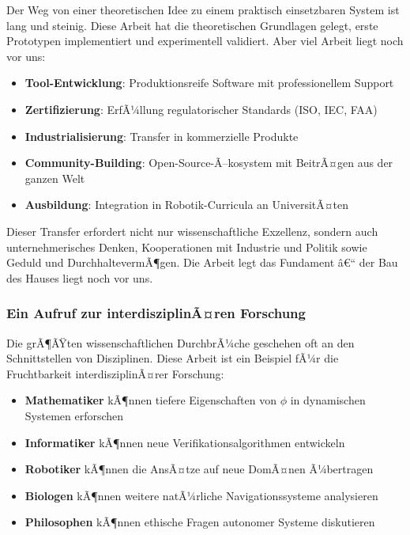 ﻿\documentclass[a4paper,12pt]{article}
\theoremstyle{definition}
\begin{document}
Der Weg von einer theoretischen Idee zu einem praktisch einsetzbaren System ist lang und steinig. Diese Arbeit hat die theoretischen Grundlagen gelegt, erste Prototypen implementiert und experimentell validiert. Aber viel Arbeit liegt noch vor uns:

\begin{itemize}
	\item \textbf{Tool-Entwicklung}: Produktionsreife Software mit professionellem Support
	\item \textbf{Zertifizierung}: ErfÃ¼llung regulatorischer Standards (ISO, IEC, FAA)
	\item \textbf{Industrialisierung}: Transfer in kommerzielle Produkte
	\item \textbf{Community-Building}: Open-Source-Ã–kosystem mit BeitrÃ¤gen aus der ganzen Welt
	\item \textbf{Ausbildung}: Integration in Robotik-Curricula an UniversitÃ¤ten
\end{itemize}

Dieser Transfer erfordert nicht nur wissenschaftliche Exzellenz, sondern auch unternehmerisches Denken, Kooperationen mit Industrie und Politik sowie Geduld und DurchhaltevermÃ¶gen. Die Arbeit legt das Fundament â€“ der Bau des Hauses liegt noch vor uns.

\subsubsection{Ein Aufruf zur interdisziplinÃ¤ren Forschung}

Die grÃ¶ÃŸten wissenschaftlichen DurchbrÃ¼che geschehen oft an den Schnittstellen von Disziplinen. Diese Arbeit ist ein Beispiel fÃ¼r die Fruchtbarkeit interdisziplinÃ¤rer Forschung:

\begin{itemize}
	\item \textbf{Mathematiker} kÃ¶nnen tiefere Eigenschaften von $\phi$ in dynamischen Systemen erforschen
	\item \textbf{Informatiker} kÃ¶nnen neue Verifikationsalgorithmen entwickeln
	\item \textbf{Robotiker} kÃ¶nnen die AnsÃ¤tze auf neue DomÃ¤nen Ã¼bertragen
	\item \textbf{Biologen} kÃ¶nnen weitere natÃ¼rliche Navigationssysteme analysieren
	\item \textbf{Philosophen} kÃ¶nnen ethische Fragen autonomer Systeme diskutieren
\end{itemize}
\end{document}
